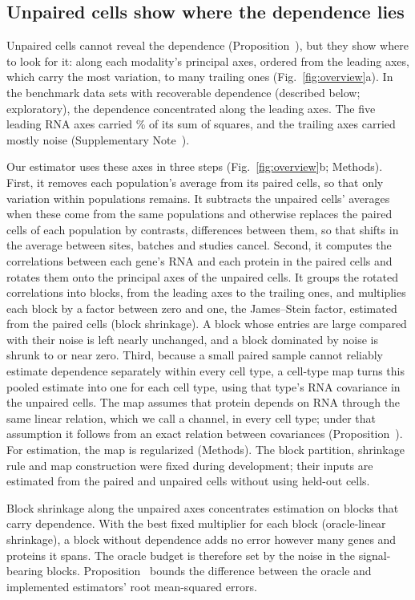 \documentclass[pdflatex,sn-vancouver-num,iicol]{sn-jnl}
\begin{document}
\subsection{Unpaired cells show where the dependence lies}
Unpaired cells cannot reveal the dependence (Proposition~), but they show where to look for it: along each modality's principal axes, ordered from the leading axes, which carry the most variation, to many trailing ones (Fig.~\ref{fig:overview}a). In the \PredProfileN{} benchmark data sets with recoverable dependence (described below; exploratory), the dependence concentrated along the leading axes. The five leading RNA axes carried \PredProfileTop\% of its sum of squares, and the trailing axes carried mostly noise (Supplementary Note~).

Our estimator uses these axes in three steps (Fig.~\ref{fig:overview}b; Methods). First, it removes each population's average from its paired cells, so that only variation within populations remains. It subtracts the unpaired cells' averages when these come from the same populations and otherwise replaces the paired cells of each population by contrasts, differences between them, so that shifts in the average between sites, batches and studies cancel. Second, it computes the correlations between each gene's RNA and each protein in the paired cells and rotates them onto the principal axes of the unpaired cells. It groups the rotated correlations into blocks, from the leading axes to the trailing ones, and multiplies each block by a factor between zero and one, the James--Stein factor\cite{james1961,baranchik1970}, estimated from the paired cells (block shrinkage). A block whose entries are large compared with their noise is left nearly unchanged, and a block dominated by noise is shrunk to or near zero. Third, because a small paired sample cannot reliably estimate dependence separately within every cell type, a cell-type map turns this pooled estimate into one for each cell type, using that type's RNA covariance in the unpaired cells. The map assumes that protein depends on RNA through the same linear relation, which we call a channel, in every cell type; under that assumption it follows from an exact relation between covariances (Proposition~). For estimation, the map is regularized (Methods). The block partition, shrinkage rule and map construction were fixed during development; their inputs are estimated from the paired and unpaired cells without using held-out cells.

Block shrinkage along the unpaired axes concentrates estimation on blocks that carry dependence. With the best fixed multiplier for each block (oracle-linear shrinkage), a block without dependence adds no error however many genes and proteins it spans. The oracle budget is therefore set by the noise in the signal-bearing blocks. Proposition~ bounds the difference between the oracle and implemented estimators' root mean-squared errors.
\end{document}
